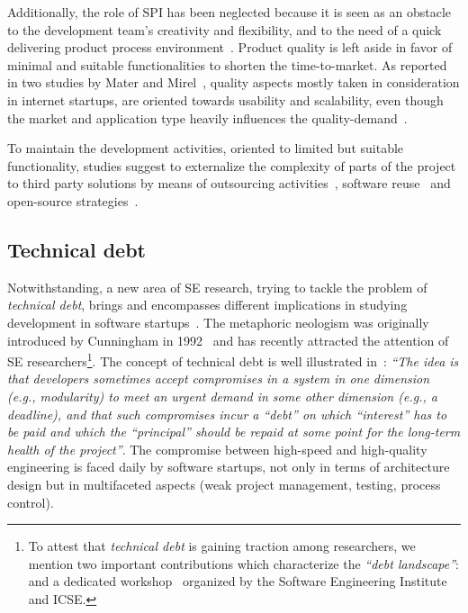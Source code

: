 \documentclass[10pt,journal,letterpaper,compsoc]{IEEEtran}
\begin{document}
Additionally, the role of SPI has been neglected because it is seen as an 
obstacle to the development team's creativity and flexibility, and to the need 
of a quick delivering product process environment~\cite{Coleman2008a}. 
Product quality is left aside in favor of minimal and suitable functionalities 
to shorten the time-to-market. As reported in two studies by Mater and 
Mirel~\cite{Mater2000, Mirel2000}, quality aspects mostly taken in 
consideration in internet startups, are oriented towards usability and 
scalability, even though the market and application type heavily influences the 
quality-demand~\cite{Coleman2008, Kim2005}.

To maintain the development activities, oriented to limited but suitable
functionality, studies suggest to externalize the complexity of parts of the
project to third party solutions by means of outsourcing 
activities~\cite{Hanna2010}, software reuse~\cite{Jansen2008} and open-source 
strategies~\cite{Wall2001, Bean2005}. %

\subsection{Technical debt} 
Notwithstanding, a new area of SE research, trying to tackle the problem of 
\textit{technical debt}, brings and encompasses different implications in 
studying development in software startups~\cite{Tom2013}. The metaphoric 
neologism was originally introduced by Cunningham in 
1992~\cite{TechnicalDebtCunn} and has recently attracted the
attention of SE researchers\footnote{To attest that \textit{technical
debt} is gaining traction among researchers, we mention two important
contributions which characterize the \textit{``debt landscape''}:
\cite{Nugroho2011,Izurieta2012} and a dedicated workshop~\cite{workshopDebt}
organized by the Software Engineering Institute and ICSE.}. The concept of
technical debt is well illustrated in~\cite{Brown:2010:MTD:1882362.1882373}: 
\textit{``The idea is that developers sometimes accept compromises in a system 
in one dimension (e.g., modularity) to meet an urgent demand in some other 
dimension (e.g., a deadline), and that such compromises incur a ``debt'' on 
which ``interest'' has to be paid and which the ``principal'' should be repaid 
at some point for the long-term health of the project''}. The compromise 
between high-speed and high-quality engineering is faced daily by software 
startups, not only in terms of architecture design but in multifaceted aspects 
(weak project management, testing, process control).
\end{document}
